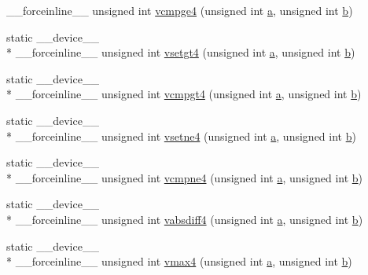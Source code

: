 \begin{DoxyCompactItemize}
\-\_\-\-\_\-forceinline\-\_\-\-\_\- unsigned int \hyperlink{namespacecv_1_1gpu_1_1device_a62e8b41a8a41f3df4c5aa57fdecbec32}{vcmpge4} (unsigned int \hyperlink{legacy_8hpp_a1031d0e0a97a340abfe0a6ab9e831045}{a}, unsigned int \hyperlink{legacy_8hpp_ac04272e8ca865b8fba18d36edae9fd2a}{b})
\item 
static \-\_\-\-\_\-device\-\_\-\-\_\- \\*
\-\_\-\-\_\-forceinline\-\_\-\-\_\- unsigned int \hyperlink{namespacecv_1_1gpu_1_1device_a13ef637ea40c3696e7df81aae1a2130f}{vsetgt4} (unsigned int \hyperlink{legacy_8hpp_a1031d0e0a97a340abfe0a6ab9e831045}{a}, unsigned int \hyperlink{legacy_8hpp_ac04272e8ca865b8fba18d36edae9fd2a}{b})
\item 
static \-\_\-\-\_\-device\-\_\-\-\_\- \\*
\-\_\-\-\_\-forceinline\-\_\-\-\_\- unsigned int \hyperlink{namespacecv_1_1gpu_1_1device_ae51a884f01504db8a92cc7fdee119e95}{vcmpgt4} (unsigned int \hyperlink{legacy_8hpp_a1031d0e0a97a340abfe0a6ab9e831045}{a}, unsigned int \hyperlink{legacy_8hpp_ac04272e8ca865b8fba18d36edae9fd2a}{b})
\item 
static \-\_\-\-\_\-device\-\_\-\-\_\- \\*
\-\_\-\-\_\-forceinline\-\_\-\-\_\- unsigned int \hyperlink{namespacecv_1_1gpu_1_1device_ac3be1b420b94ebc218466926effc8ad3}{vsetne4} (unsigned int \hyperlink{legacy_8hpp_a1031d0e0a97a340abfe0a6ab9e831045}{a}, unsigned int \hyperlink{legacy_8hpp_ac04272e8ca865b8fba18d36edae9fd2a}{b})
\item 
static \-\_\-\-\_\-device\-\_\-\-\_\- \\*
\-\_\-\-\_\-forceinline\-\_\-\-\_\- unsigned int \hyperlink{namespacecv_1_1gpu_1_1device_a10ef491bddaa7002591016c9108ec7c6}{vcmpne4} (unsigned int \hyperlink{legacy_8hpp_a1031d0e0a97a340abfe0a6ab9e831045}{a}, unsigned int \hyperlink{legacy_8hpp_ac04272e8ca865b8fba18d36edae9fd2a}{b})
\item 
static \-\_\-\-\_\-device\-\_\-\-\_\- \\*
\-\_\-\-\_\-forceinline\-\_\-\-\_\- unsigned int \hyperlink{namespacecv_1_1gpu_1_1device_a00990d53aa3a6688c09dd44edeb526b5}{vabsdiff4} (unsigned int \hyperlink{legacy_8hpp_a1031d0e0a97a340abfe0a6ab9e831045}{a}, unsigned int \hyperlink{legacy_8hpp_ac04272e8ca865b8fba18d36edae9fd2a}{b})
\item 
static \-\_\-\-\_\-device\-\_\-\-\_\- \\*
\-\_\-\-\_\-forceinline\-\_\-\-\_\- unsigned int \hyperlink{namespacecv_1_1gpu_1_1device_a7af151444f37da62c1d8abe4d16888b2}{vmax4} (unsigned int \hyperlink{legacy_8hpp_a1031d0e0a97a340abfe0a6ab9e831045}{a}, unsigned int \hyperlink{legacy_8hpp_ac04272e8ca865b8fba18d36edae9fd2a}{b})

\end{DoxyCompactItemize}
